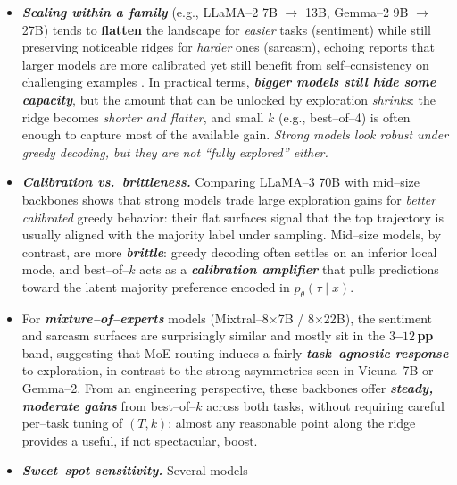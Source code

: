 \begin{itemize}[leftmargin=1.5em]
  \item \emph{\textbf{Scaling within a family}} (e.g., LLaMA--2 7B
        $\rightarrow$ 13B, Gemma--2 9B $\rightarrow$ 27B) tends to
        \textbf{flatten} the landscape for \emph{easier} tasks
        (sentiment) while still preserving noticeable ridges for
        \emph{harder} ones (sarcasm), echoing reports that larger models
        are more calibrated yet still benefit from self--consistency on
        challenging examples
        \citep{wei2022chainofthought,schaeffer2023emergent}. In
        practical terms, \emph{\textbf{bigger models still hide some
        capacity}}, but the amount that can be unlocked by exploration
        \emph{shrinks}: the ridge becomes \emph{shorter and flatter}, and
        small $k$ (e.g., best--of--4) is often enough to capture most of
        the available gain. \emph{Strong models look robust under
        greedy decoding, but they are not ``fully explored'' either.}
  \item \emph{\textbf{Calibration vs.\ brittleness.}} Comparing
        LLaMA--3 70B with mid--size backbones shows that strong models
        trade large exploration gains for \emph{better calibrated}
        greedy behavior: their flat surfaces signal that the top
        trajectory is usually aligned with the majority label under
        sampling. Mid--size models, by contrast, are more
        \emph{\textbf{brittle}}: greedy decoding often settles on an
        inferior local mode, and best--of--$k$ acts as a
        \emph{\textbf{calibration amplifier}} that pulls predictions
        toward the latent majority preference encoded in
        $p_\theta(\tau\mid x)$.
  \item For \emph{\textbf{mixture--of--experts}} models
        (Mixtral--8$\times$7B / 8$\times$22B), the sentiment and sarcasm
        surfaces are surprisingly similar and mostly sit in the
        \textbf{$3$--$12$\,pp} band, suggesting that MoE routing induces
        a fairly \emph{\textbf{task--agnostic response}} to exploration,
        in contrast to the strong asymmetries seen in Vicuna--7B or
        Gemma--2. From an engineering perspective, these backbones offer
        \emph{\textbf{steady, moderate gains}} from best--of--$k$ across
        both tasks, without requiring careful per--task tuning of
        $(T,k)$: almost any reasonable point along the ridge provides a
        useful, if not spectacular, boost.
  \item \emph{\textbf{Sweet--spot sensitivity.}} Several models

\end{itemize}
